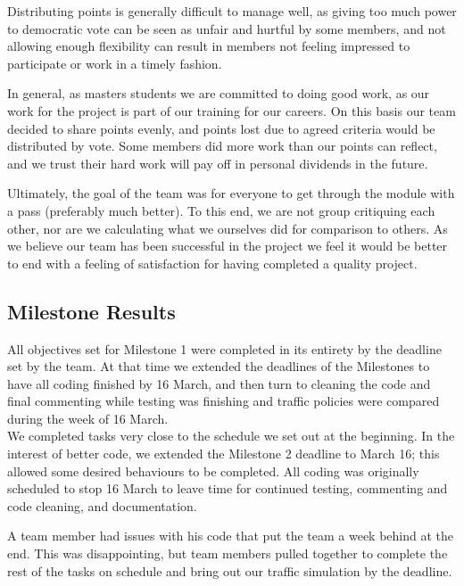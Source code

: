 \documentclass[11pt]{article}
\begin{document}
\begin{enumerate}
Distributing points is generally difficult to manage well, as giving too much power to democratic vote can be seen as unfair and hurtful by some members, and not allowing enough flexibility can result in members not feeling impressed to participate or work in a timely fashion. 

In general, as masters students we are committed to doing good work, as our work for the project is part of our training for our careers. On this basis our team decided to share points evenly, and points lost due to agreed criteria would be distributed by vote. Some members did more work than our points can reflect, and we trust their hard work will pay off in personal dividends in the future.

Ultimately, the goal of the team was for everyone to get through the module with a pass (preferably much better). To this end, we are not group critiquing each other, nor are we calculating what we ourselves did for comparison to others. As we believe our team has been successful in the project we feel it would be better to end with a feeling of satisfaction for having completed a quality project.


\subsection{Milestone Results}

All objectives set for Milestone 1 were completed in its entirety by the deadline set by the team. At that time we extended the deadlines of the Milestones to have all coding finished by 16 March, and then turn to cleaning the code and final commenting while testing was finishing and traffic policies were compared during the week of 16 March.
\\
We completed tasks very close to the schedule we set out at the beginning. In the interest of better code, we extended the Milestone 2 deadline to March 16; this allowed some desired behaviours to be completed. All coding was originally scheduled to stop 16 March to leave time for continued testing, commenting and code cleaning, and documentation. 

A team member had issues with his code that put the team a week behind at the end. This was disappointing, but team members pulled together to complete the rest of the tasks on schedule and bring out our traffic simulation by the deadline.
\\


\end{enumerate}
\end{document}
